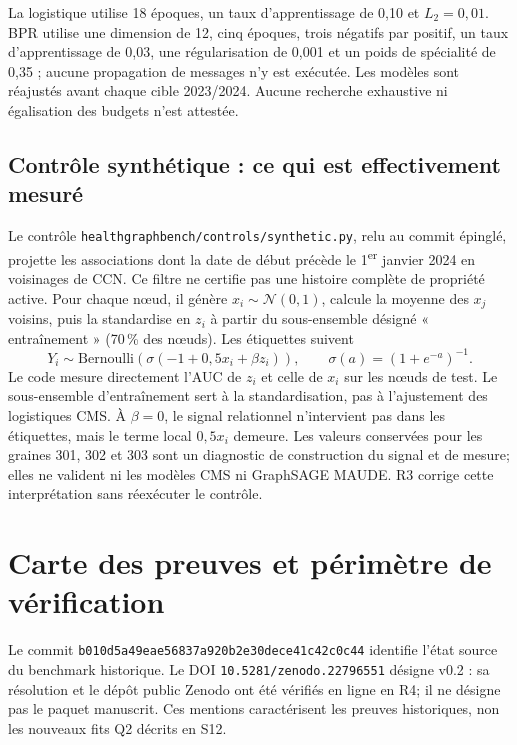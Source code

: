 \documentclass[10pt,a4paper]{article}
\newcommand{\src}[1]{{\small\nolinkurl{#1}}}
\begin{document}
La logistique utilise 18 époques, un taux d'apprentissage de 0,10 et $L_2=0,01$. BPR utilise une dimension de 12, cinq époques, trois négatifs par positif, un taux d'apprentissage de 0,03, une régularisation de 0,001 et un poids de spécialité de 0,35 ; aucune propagation de messages n'y est exécutée. Les modèles sont réajustés avant chaque cible 2023/2024. Aucune recherche exhaustive ni égalisation des budgets n'est attestée.

\par{}
\subsection{Contrôle synthétique : ce qui est effectivement mesuré}
\label{supp:control}
Le contrôle \src{healthgraphbench/controls/synthetic.py}, relu au commit épinglé, projette les associations dont la date de début précède le 1\textsuperscript{er} janvier 2024 en voisinages de CCN. Ce filtre ne certifie pas une histoire complète de propriété active. Pour chaque nœud, il génère $x_i\sim\mathcal N(0,1)$, calcule la moyenne des $x_j$ voisins, puis la standardise en $z_i$ à partir du sous-ensemble désigné « entraînement » (70\,\% des nœuds). Les étiquettes suivent
\[
Y_i\sim\mathrm{Bernoulli}\!\left(\sigma(-1+0,5x_i+\beta z_i)\right),
\qquad \sigma(a)=(1+e^{-a})^{-1}.
\]
Le code mesure directement l'AUC de $z_i$ et celle de $x_i$ sur les nœuds de test. Le sous-ensemble d'entraînement sert à la standardisation, pas à l'ajustement des logistiques CMS. À $\beta=0$, le signal relationnel n'intervient pas dans les étiquettes, mais le terme local $0,5x_i$ demeure. Les valeurs conservées pour les graines 301, 302 et 303 sont un diagnostic de construction du signal et de mesure; elles ne valident ni les modèles CMS ni GraphSAGE MAUDE\cite{hgbcontrols}. R3 corrige cette interprétation sans réexécuter le contrôle.


\section{Carte des preuves et périmètre de vérification}
\label{supp:evidence}
Le commit \nolinkurl{b010d5a49eae56837a920b2e30dece41c42c0c44} identifie l'état source du benchmark historique\cite{hgb2026,hgbresults}. Le DOI \nolinkurl{10.5281/zenodo.22796551} désigne v0.2 : sa résolution et le dépôt public Zenodo ont été vérifiés en ligne en R4; il ne désigne pas le paquet manuscrit. Ces mentions caractérisent les preuves historiques, non les nouveaux fits Q2 décrits en S12.
\end{document}
